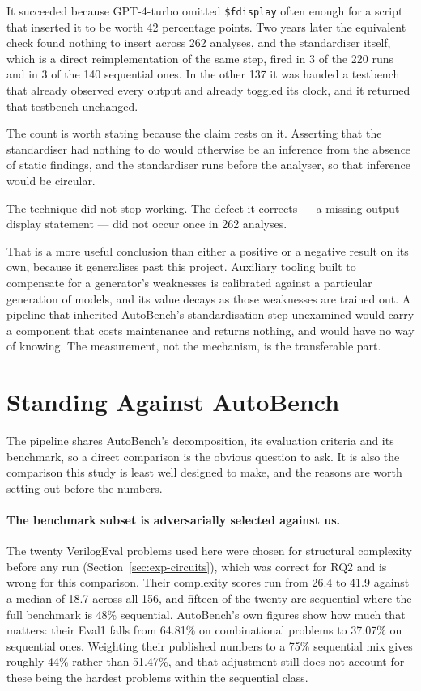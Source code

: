 \documentclass[11pt,a4paper,titlepage=false]{scrreprt}
\begin{document}
It succeeded because GPT-4-turbo omitted \texttt{\$fdisplay} often enough for a script that
inserted it to be worth 42 percentage points. Two years later the equivalent check found
nothing to insert across 262 analyses, and the standardiser itself, which is a direct
reimplementation of the same step, fired in 3 of the 220 runs and in 3 of the 140 sequential
ones. In the other 137 it was handed a testbench that already observed every output and
already toggled its clock, and it returned that testbench unchanged.

The count is worth stating because the claim rests on it. Asserting that the standardiser
had nothing to do would otherwise be an inference from the absence of static findings, and
the standardiser runs before the analyser, so that inference would be circular.

The technique did not stop working. The defect it corrects --- a missing output-display
statement --- did not occur once in 262 analyses.

That is a more useful conclusion than either a positive or a negative result on its own,
because it generalises past this project. Auxiliary tooling built to compensate for a
generator's weaknesses is calibrated against a particular generation of models, and its
value decays as those weaknesses are trained out. A pipeline that inherited AutoBench's
standardisation step unexamined would carry a component that costs maintenance and returns
nothing, and would have no way of knowing. The measurement, not the mechanism, is the
transferable part.

\section{Standing Against AutoBench}\label{sec:disc-autobench-compare}

The pipeline shares AutoBench's decomposition, its evaluation criteria and its benchmark, so
a direct comparison is the obvious question to ask. It is also the comparison this study is
least well designed to make, and the reasons are worth setting out before the numbers.

\paragraph{The benchmark subset is adversarially selected against us.} The twenty VerilogEval
problems used here were chosen for structural complexity before any run
(Section~\ref{sec:exp-circuits}), which was correct for RQ2 and is wrong for this comparison.
Their complexity scores run from 26.4 to 41.9 against a median of 18.7 across all 156, and
fifteen of the twenty are sequential where the full benchmark is 48\% sequential. AutoBench's
own figures show how much that matters: their Eval1 falls from 64.81\% on combinational
problems to 37.07\% on sequential ones. Weighting their published numbers to a 75\%
sequential mix gives roughly 44\% rather than 51.47\%, and that adjustment still does not
account for these being the hardest problems within the sequential class.
\end{document}
